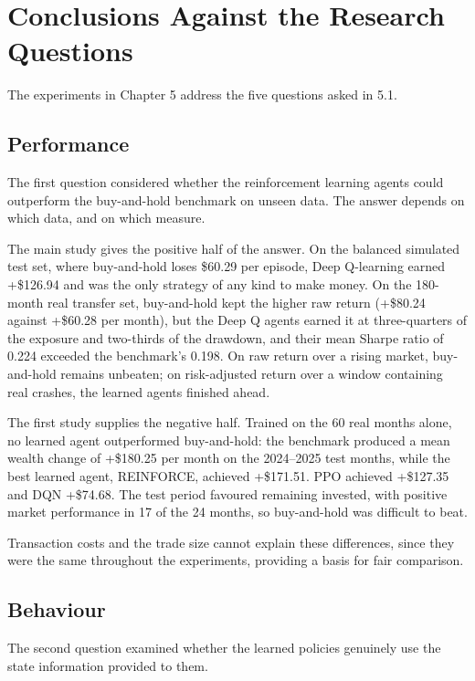 \section{Conclusions Against the Research Questions}

The experiments in Chapter 5 address the five questions asked in 5.1.

\subsection{Performance}

The first question considered whether the reinforcement learning agents
could outperform the buy-and-hold benchmark on unseen data. The answer
depends on which data, and on which measure.

The main study gives the positive half of the answer. On the balanced
simulated test set, where buy-and-hold loses \$60.29 per episode, Deep
Q-learning earned +\$126.94 and was the only strategy of any kind to
make money. On the 180-month real transfer set, buy-and-hold kept the
higher raw return (+\$80.24 against +\$60.28 per month), but the Deep Q
agents earned it at three-quarters of the exposure and two-thirds of the
drawdown, and their mean Sharpe ratio of 0.224 exceeded the benchmark's
0.198. On raw return over a rising market, buy-and-hold remains
unbeaten; on risk-adjusted return over a window containing real crashes,
the learned agents finished ahead.

The first study supplies the negative half. Trained on the 60 real
months alone, no learned agent outperformed buy-and-hold: the benchmark
produced a mean wealth change of +\$180.25 per month on the 2024--2025
test months, while the best learned agent, REINFORCE, achieved
+\$171.51. PPO achieved +\$127.35 and DQN +\$74.68. The test period
favoured remaining invested, with positive market performance in 17 of
the 24 months, so buy-and-hold was difficult to beat.

Transaction costs and the trade size cannot explain these differences,
since they were the same throughout the experiments, providing a basis
for fair comparison.

\subsection{Behaviour}

The second question examined whether the learned policies genuinely use
the state information provided to them.

